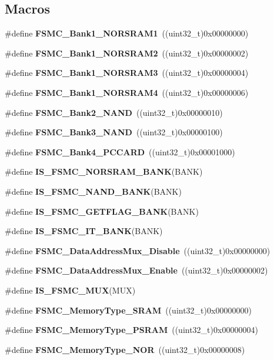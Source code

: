 \subsection*{Macros}
\begin{DoxyCompactItemize}
\item 
\#define \textbf{ F\+S\+M\+C\+\_\+\+Bank1\+\_\+\+N\+O\+R\+S\+R\+A\+M1}~((uint32\+\_\+t)0x00000000)
\item 
\#define \textbf{ F\+S\+M\+C\+\_\+\+Bank1\+\_\+\+N\+O\+R\+S\+R\+A\+M2}~((uint32\+\_\+t)0x00000002)
\item 
\#define \textbf{ F\+S\+M\+C\+\_\+\+Bank1\+\_\+\+N\+O\+R\+S\+R\+A\+M3}~((uint32\+\_\+t)0x00000004)
\item 
\#define \textbf{ F\+S\+M\+C\+\_\+\+Bank1\+\_\+\+N\+O\+R\+S\+R\+A\+M4}~((uint32\+\_\+t)0x00000006)
\item 
\#define \textbf{ F\+S\+M\+C\+\_\+\+Bank2\+\_\+\+N\+A\+ND}~((uint32\+\_\+t)0x00000010)
\item 
\#define \textbf{ F\+S\+M\+C\+\_\+\+Bank3\+\_\+\+N\+A\+ND}~((uint32\+\_\+t)0x00000100)
\item 
\#define \textbf{ F\+S\+M\+C\+\_\+\+Bank4\+\_\+\+P\+C\+C\+A\+RD}~((uint32\+\_\+t)0x00001000)
\item 
\#define \textbf{ I\+S\+\_\+\+F\+S\+M\+C\+\_\+\+N\+O\+R\+S\+R\+A\+M\+\_\+\+B\+A\+NK}(B\+A\+NK)
\item 
\#define \textbf{ I\+S\+\_\+\+F\+S\+M\+C\+\_\+\+N\+A\+N\+D\+\_\+\+B\+A\+NK}(B\+A\+NK)
\item 
\#define \textbf{ I\+S\+\_\+\+F\+S\+M\+C\+\_\+\+G\+E\+T\+F\+L\+A\+G\+\_\+\+B\+A\+NK}(B\+A\+NK)
\item 
\#define \textbf{ I\+S\+\_\+\+F\+S\+M\+C\+\_\+\+I\+T\+\_\+\+B\+A\+NK}(B\+A\+NK)
\item 
\#define \textbf{ F\+S\+M\+C\+\_\+\+Data\+Address\+Mux\+\_\+\+Disable}~((uint32\+\_\+t)0x00000000)
\item 
\#define \textbf{ F\+S\+M\+C\+\_\+\+Data\+Address\+Mux\+\_\+\+Enable}~((uint32\+\_\+t)0x00000002)
\item 
\#define \textbf{ I\+S\+\_\+\+F\+S\+M\+C\+\_\+\+M\+UX}(M\+UX)
\item 
\#define \textbf{ F\+S\+M\+C\+\_\+\+Memory\+Type\+\_\+\+S\+R\+AM}~((uint32\+\_\+t)0x00000000)
\item 
\#define \textbf{ F\+S\+M\+C\+\_\+\+Memory\+Type\+\_\+\+P\+S\+R\+AM}~((uint32\+\_\+t)0x00000004)
\item 
\#define \textbf{ F\+S\+M\+C\+\_\+\+Memory\+Type\+\_\+\+N\+OR}~((uint32\+\_\+t)0x00000008)

\end{DoxyCompactItemize}
